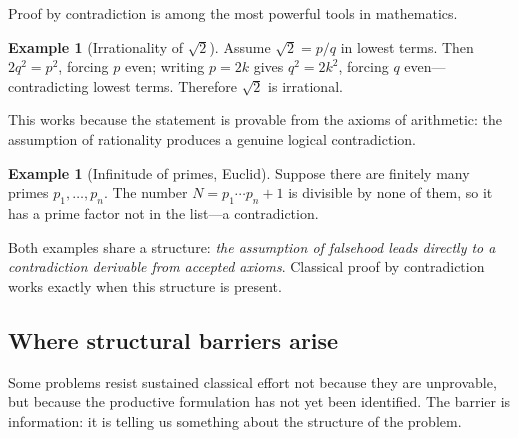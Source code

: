 \documentclass[12pt]{amsart}
\theoremstyle{plain}
\theoremstyle{definition}
\newtheorem{example}[theorem]{Example}
\theoremstyle{remark}
\begin{document}
Proof by contradiction is among the most powerful tools in mathematics.

\begin{example}[Irrationality of $\sqrt{2}$]
Assume $\sqrt{2} = p/q$ in lowest terms. Then $2q^2 = p^2$, forcing $p$ even;
writing $p = 2k$ gives $q^2 = 2k^2$, forcing $q$ even---contradicting lowest
terms. Therefore $\sqrt{2}$ is irrational.
\end{example}

This works because the statement is provable from the axioms of arithmetic:
the assumption of rationality produces a genuine logical contradiction.

\begin{example}[Infinitude of primes, Euclid]
Suppose there are finitely many primes $p_1, \ldots, p_n$. The number
$N = p_1 \cdots p_n + 1$ is divisible by none of them, so it has a prime factor
not in the list---a contradiction.
\end{example}

Both examples share a structure: \emph{the assumption of falsehood leads
directly to a contradiction derivable from accepted axioms}. Classical proof
by contradiction works exactly when this structure is present.

\subsection{Where structural barriers arise}
\label{sec:barriers}

Some problems resist sustained classical effort not because they are
unprovable, but because the productive formulation has not yet been identified.
The barrier is information: it is telling us something about the structure of
the problem.
\end{document}
